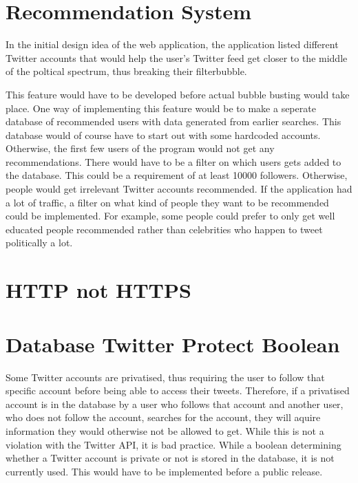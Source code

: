 \section{Recommendation System}
In the initial design idea of the web application, the application listed
different Twitter accounts that would help the user's Twitter feed get closer to
the middle of the poltical spectrum, thus breaking their filterbubble. \nl

This feature would have to be developed before actual bubble busting would take
place. One way of implementing this feature would be to make a seperate
database of recommended users with data generated from earlier searches. This
database would of course have to start out with some hardcoded accounts.
Otherwise, the first few users of the program would not get any
recommendations. There would have to be a filter on which users gets added to
the database. This could be a requirement of at least 10000 followers.
Otherwise, people would get irrelevant Twitter accounts recommended. If the
application had a lot of traffic, a filter on what kind of people they want to
be recommended could be implemented. For example, some people could prefer to
only get well educated people recommended rather than celebrities who happen to
tweet politically a lot.

\section{HTTP not HTTPS}

\section{Database Twitter Protect Boolean}\label{sec:twitterProtect}
Some Twitter accounts are privatised, thus requiring the user to follow that
specific account before being able to access their tweets. Therefore, if a
privatised account is in the database by a user who follows that account and
another user, who does not follow the account, searches for the account, they
will aquire information they would otherwise not be allowed to get. While this
is not a violation with the Twitter API, it is bad practice. While a boolean
determining whether a Twitter account is private or not is stored in the
database, it is not currently used. This would have to be implemented before a
public release.

% 
% 
